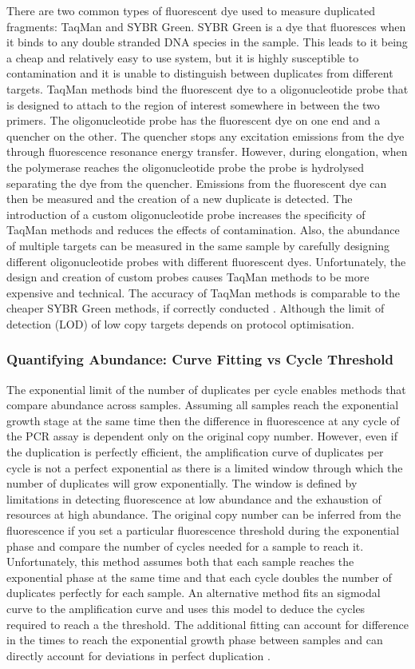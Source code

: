 \documentclass[../main.tex]{subfiles}
\begin{document}
There are two common types of fluorescent dye used to measure duplicated fragments: TaqMan and SYBR Green.
SYBR Green is a dye that fluoresces when it binds to any double stranded DNA species in the sample.
This leads to it being a cheap and relatively easy to use system, but it is highly susceptible to contamination and it is unable to distinguish between duplicates from different targets. 
TaqMan methods bind the fluorescent dye to a oligonucleotide probe that is designed to attach to the region of interest somewhere in between the two primers. 
The oligonucleotide probe has the fluorescent dye on one end and a quencher on the other.
The quencher stops any excitation emissions from the dye through fluorescence resonance energy transfer. 
However, during elongation, when the polymerase reaches the oligonucleotide probe the probe is hydrolysed separating the dye from the quencher.
Emissions from the fluorescent dye can then be measured and the creation of a new duplicate is detected. 
The introduction of a custom oligonucleotide probe increases the specificity of TaqMan methods and reduces the effects of contamination. 
Also, the abundance of multiple targets can be measured in the same sample by carefully designing different oligonucleotide probes with different fluorescent dyes.
Unfortunately, the design and creation of custom probes causes TaqMan methods to be more expensive and technical. 
The accuracy of TaqMan methods is comparable to the cheaper SYBR Green methods, if correctly conducted \parencite{Tajadini2014}.
Although the limit of detection (LOD) of low copy targets depends on protocol optimisation. 

\subsubsection{Quantifying Abundance: Curve Fitting vs Cycle Threshold}

The exponential limit of the number of duplicates per cycle enables methods that compare abundance across samples. 
Assuming all samples reach the exponential growth stage at the same time then the difference in fluorescence at any cycle of the PCR assay is dependent only on the original copy number. 
However, even if the duplication is perfectly efficient, the amplification curve of duplicates per cycle is not a perfect exponential as there is a limited window through which the number of duplicates will grow exponentially.
The window is defined by limitations in detecting fluorescence at low abundance and the exhaustion of resources at high abundance.
The original copy number can be inferred from the fluorescence if you set a particular fluorescence threshold during the exponential phase and compare the number of cycles needed for a sample to reach it.
Unfortunately, this method assumes both that each sample reaches the exponential phase at the same time and that each cycle doubles the number of duplicates perfectly for each sample. 
An alternative method fits an sigmodal curve to the amplification curve and uses this model to deduce the cycles required to reach a the threshold.
The additional fitting can account for difference in the times to reach the exponential growth phase between samples and can directly account for deviations in perfect duplication \parencite{Swillens2008}. 
\end{document}
